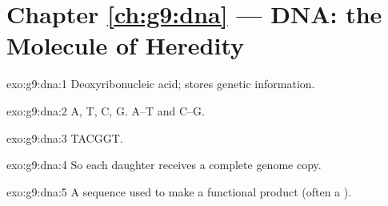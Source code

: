 \section*{Chapter \ref{ch:g9:dna} --- DNA: the Molecule of Heredity}

\begin{solution}{exo:g9:dna:1}
Deoxyribonucleic acid; stores genetic information.
\end{solution}

\begin{solution}{exo:g9:dna:2}
A, T, C, G. A--T and C--G.
\end{solution}

\begin{solution}{exo:g9:dna:3}
TACGGT.
\end{solution}

\begin{solution}{exo:g9:dna:4}
So each daughter  receives a complete genome copy.
\end{solution}

\begin{solution}{exo:g9:dna:5}
A  sequence used to make a functional product (often a ).
\end{solution}

